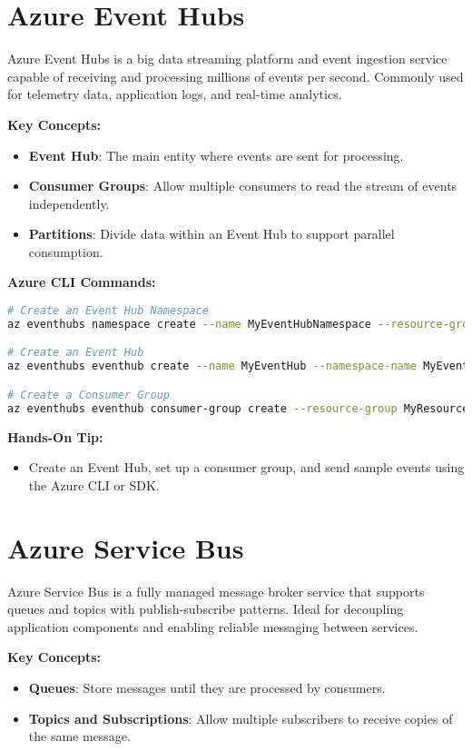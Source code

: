 \documentclass{article}
\begin{document}
\section{Azure Event Hubs}
Azure Event Hubs is a big data streaming platform and event ingestion service capable of receiving and processing millions of events per second. Commonly used for telemetry data, application logs, and real-time analytics.

\textbf{Key Concepts:}
\begin{itemize}
    \item \textbf{Event Hub}: The main entity where events are sent for processing.
    \item \textbf{Consumer Groups}: Allow multiple consumers to read the stream of events independently.
    \item \textbf{Partitions}: Divide data within an Event Hub to support parallel consumption.
\end{itemize}

\textbf{Azure CLI Commands:}
\begin{lstlisting}[language=bash]
# Create an Event Hub Namespace
az eventhubs namespace create --name MyEventHubNamespace --resource-group MyResourceGroup --location eastus

# Create an Event Hub
az eventhubs eventhub create --name MyEventHub --namespace-name MyEventHubNamespace --resource-group MyResourceGroup

# Create a Consumer Group
az eventhubs eventhub consumer-group create --resource-group MyResourceGroup --namespace-name MyEventHubNamespace --eventhub-name MyEventHub --name MyConsumerGroup
\end{lstlisting}

\textbf{Hands-On Tip:}
\begin{itemize}
    \item Create an Event Hub, set up a consumer group, and send sample events using the Azure CLI or SDK.
\end{itemize}

\section{Azure Service Bus}
Azure Service Bus is a fully managed message broker service that supports queues and topics with publish-subscribe patterns. Ideal for decoupling application components and enabling reliable messaging between services.

\textbf{Key Concepts:}
\begin{itemize}
    \item \textbf{Queues}: Store messages until they are processed by consumers.
    \item \textbf{Topics and Subscriptions}: Allow multiple subscribers to receive copies of the same message.
\end{itemize}
\end{document}
